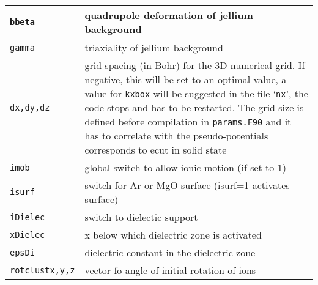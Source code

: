 \documentclass[11pt,a4paper]{article}
\begin{document}
\begin{table}[t]
\begin{tabular}{|p{3.5cm}|p{11.2cm}|}
				\hline
				\texttt{bbeta         }& quadrupole deformation of jellium background\\
				\hline
				\texttt{gamma         }& triaxiality of jellium background\\
				\hline
				\texttt{dx,dy,dz        }& grid spacing (in  Bohr) for the 3D numerical grid. If negative, this will be set to an optimal value, a value for \texttt{kxbox}  will be suggested in the file `\texttt{nx}', the code stops and has to be restarted. The grid size is defined before compilation in \texttt{params.F90} and it has to correlate with the pseudo-potentials corresponds to ecut in solid state\\
				\hline
				\texttt{imob}& global switch to allow ionic motion (if set to 1) \\
				\hline
				\texttt{isurf}& switch for Ar or MgO surface (isurf=1 activates surface)\\
				\hline
				\texttt{iDielec}& switch to dielectic support\\
				\hline
				\texttt{xDielec}& x below which dielectric zone is activated\\
				\hline
				\texttt{epsDi}& dielectric constant in the dielectric zone\\
				\hline
				\texttt{rotclustx,y,z} & vector fo angle of initial rotation of ions\\
				\hline
			\end{tabular}
		\end{table}
\end{document}
